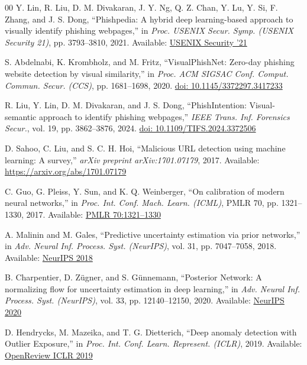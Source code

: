 \documentclass[conference]{IEEEtran}
\begin{document}
\begin{thebibliography}{00}
 Y. Lin, R. Liu, D. M. Divakaran, J. Y. Ng, Q. Z. Chan, Y. Lu, Y. Si, F. Zhang, and J. S. Dong, ``Phishpedia: A hybrid deep learning-based approach to visually identify phishing webpages,'' in \textit{Proc. USENIX Secur. Symp. (USENIX Security 21)}, pp. 3793--3810, 2021. Available: \href{https://www.usenix.org/conference/usenixsecurity21/presentation/lin}{USENIX Security '21}

 S. Abdelnabi, K. Krombholz, and M. Fritz, ``VisualPhishNet: Zero-day phishing website detection by visual similarity,'' in \textit{Proc. ACM SIGSAC Conf. Comput. Commun. Secur. (CCS)}, pp. 1681--1698, 2020. \href{https://doi.org/10.1145/3372297.3417233}{doi: 10.1145/3372297.3417233}

 R. Liu, Y. Lin, D. M. Divakaran, and J. S. Dong, ``PhishIntention: Visual-semantic approach to identify phishing webpages,'' \textit{IEEE Trans. Inf. Forensics Secur.}, vol. 19, pp. 3862--3876, 2024. \href{https://doi.org/10.1109/TIFS.2024.3372506}{doi: 10.1109/TIFS.2024.3372506}

 D. Sahoo, C. Liu, and S. C. H. Hoi, ``Malicious URL detection using machine learning: A survey,'' \textit{arXiv preprint arXiv:1701.07179}, 2017. Available: \href{https://arxiv.org/abs/1701.07179}{https://arxiv.org/abs/1701.07179}

 C. Guo, G. Pleiss, Y. Sun, and K. Q. Weinberger, ``On calibration of modern neural networks,'' in \textit{Proc. Int. Conf. Mach. Learn. (ICML)}, PMLR 70, pp. 1321--1330, 2017. Available: \href{https://proceedings.mlr.press/v70/guo17a.html}{PMLR 70:1321--1330}

 A. Malinin and M. Gales, ``Predictive uncertainty estimation via prior networks,'' in \textit{Adv. Neural Inf. Process. Syst. (NeurIPS)}, vol. 31, pp. 7047--7058, 2018. Available: \href{https://proceedings.neurips.cc/paper/2018/hash/3ea2db50e62ceefacac26866453ae9be-Abstract.html}{NeurIPS 2018}

 B. Charpentier, D. Z{\"u}gner, and S. G{\"u}nnemann, ``Posterior Network: A normalizing flow for uncertainty estimation in deep learning,'' in \textit{Adv. Neural Inf. Process. Syst. (NeurIPS)}, vol. 33, pp. 12140--12150, 2020. Available: \href{https://proceedings.neurips.cc/paper/2020/hash/8d3bba7425e7c98c50f52ca1b52d3735-Abstract.html}{NeurIPS 2020}

 D. Hendrycks, M. Mazeika, and T. G. Dietterich, ``Deep anomaly detection with Outlier Exposure,'' in \textit{Proc. Int. Conf. Learn. Represent. (ICLR)}, 2019. Available: \href{https://openreview.net/forum?id=Hyx-y3AkW}{OpenReview ICLR 2019}


\end{thebibliography}
\end{document}
